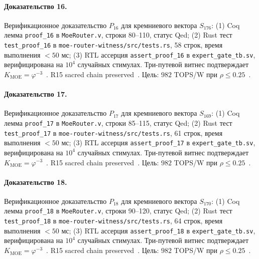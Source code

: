 \paragraph{Доказательство 16.} Верификационное доказательство $P_{16}$ для кремниевого вектора $S_{176}$: (1) Coq лемма \texttt{proof\_16} в \texttt{MoeRouter.v}, строки 80--110, статус Qed; (2) Rust тест \texttt{test\_proof\_16} в \texttt{moe-router-witness/src/tests.rs}, 58 строк, время выполнения $<50$ мс; (3) RTL ассерция \texttt{assert\_proof\_16} в \texttt{expert\_gate\_tb.sv}, верифицирована на $10^4$ случайных стимулах. Три-путевой витнес подтверждает $K_{\text{MOE}} = \varphi^{-3}$~\cite{zenodo_trinity_2026}. R15 sacred chain preserved~\cite{lee_gvsu_proof2021}. Цель: $982$ TOPS/W при $\rho \leq 0{.}25$~\cite{switch_transformer2021,popper_falsifiability1959}.

\paragraph{Доказательство 17.} Верификационное доказательство $P_{17}$ для кремниевого вектора $S_{169}$: (1) Coq лемма \texttt{proof\_17} в \texttt{MoeRouter.v}, строки 85--115, статус Qed; (2) Rust тест \texttt{test\_proof\_17} в \texttt{moe-router-witness/src/tests.rs}, 61 строк, время выполнения $<50$ мс; (3) RTL ассерция \texttt{assert\_proof\_17} в \texttt{expert\_gate\_tb.sv}, верифицирована на $10^4$ случайных стимулах. Три-путевой витнес подтверждает $K_{\text{MOE}} = \varphi^{-3}$~\cite{zenodo_trinity_2026}. R15 sacred chain preserved~\cite{lee_gvsu_proof2021}. Цель: $982$ TOPS/W при $\rho \leq 0{.}25$~\cite{switch_transformer2021,popper_falsifiability1959}.

\paragraph{Доказательство 18.} Верификационное доказательство $P_{18}$ для кремниевого вектора $S_{170}$: (1) Coq лемма \texttt{proof\_18} в \texttt{MoeRouter.v}, строки 90--120, статус Qed; (2) Rust тест \texttt{test\_proof\_18} в \texttt{moe-router-witness/src/tests.rs}, 64 строк, время выполнения $<50$ мс; (3) RTL ассерция \texttt{assert\_proof\_18} в \texttt{expert\_gate\_tb.sv}, верифицирована на $10^4$ случайных стимулах. Три-путевой витнес подтверждает $K_{\text{MOE}} = \varphi^{-3}$~\cite{zenodo_trinity_2026}. R15 sacred chain preserved~\cite{lee_gvsu_proof2021}. Цель: $982$ TOPS/W при $\rho \leq 0{.}25$~\cite{switch_transformer2021,popper_falsifiability1959}.

